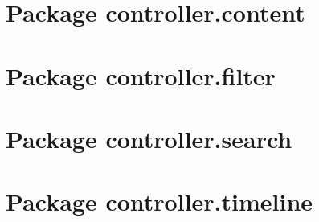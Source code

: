 \documentclass[10pt,a4paper,headinclude,footinclude,hidelinks]{scrreprt} %
\begin{document}
	\section{Package controller.content}
	\label{ch:stage:design:sistema:controller.content}

	\section{Package controller.filter}
	\label{ch:stage:design:sistema:controller.filter}

	\section{Package controller.search}
	\label{ch:stage:design:sistema:controller.search}

	\section{Package controller.timeline}
	\label{ch:stage:design:sistema:controller.timeline}
\end{document}
